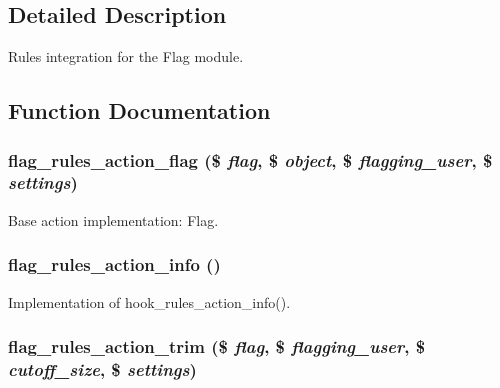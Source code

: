 \subsection{Detailed Description}
Rules integration for the Flag module. 

\subsection{Function Documentation}
\hypertarget{flag_8rules_8inc_f1ae8e72fd6b91d64a2813620ec2a37c}{
\subsubsection[{flag\_\-rules\_\-action\_\-flag}]{\setlength{\rightskip}{0pt plus 5cm}flag\_\-rules\_\-action\_\-flag (\$ {\em flag}, \/  \$ {\em object}, \/  \$ {\em flagging\_\-user}, \/  \$ {\em settings})}}
\label{flag_8rules_8inc_f1ae8e72fd6b91d64a2813620ec2a37c}


Base action implementation: Flag. \hypertarget{flag_8rules_8inc_0e96be6705a5b3a0ffee87553491c831}{
\subsubsection[{flag\_\-rules\_\-action\_\-info}]{\setlength{\rightskip}{0pt plus 5cm}flag\_\-rules\_\-action\_\-info ()}}
\label{flag_8rules_8inc_0e96be6705a5b3a0ffee87553491c831}


Implementation of hook\_\-rules\_\-action\_\-info(). \hypertarget{flag_8rules_8inc_30f73bf152c69a689ab7ebed25aed70d}{
\subsubsection[{flag\_\-rules\_\-action\_\-trim}]{\setlength{\rightskip}{0pt plus 5cm}flag\_\-rules\_\-action\_\-trim (\$ {\em flag}, \/  \$ {\em flagging\_\-user}, \/  \$ {\em cutoff\_\-size}, \/  \$ {\em settings})}}
\label{flag_8rules_8inc_30f73bf152c69a689ab7ebed25aed70d}


